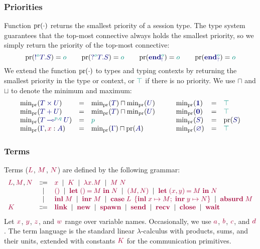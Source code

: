 \documentclass[main.tex]{subfiles}
\begin{document}
\subsubsection*{Priorities}
Function $\operatorname{pr}(\cdot)$ returns the smallest priority of a session type. The type system guarantees that the top-most connective always holds the smallest priority, so we simply return the priority of the top-most connective:
\[
  \pr(\ty{\tysend[\cs{o}]{T}{S}}) = \cs{o}
  \qquad
  \pr(\ty{\tyrecv[\cs{o}]{T}{S}}) = \cs{o}
  \qquad
  \pr(\ty{\tyends[\cs{o}]})       = \cs{o}
  \qquad
  \pr(\ty{\tyendr[\cs{o}]})       = \cs{o}
\]
We extend the function $\operatorname{pr}(\cdot)$ to types and typing contexts by returning the smallest priority in the type or context, or $\cs{\top}$ if there is no priority. We use $\sqcap$ and $\sqcup$ to denote the minimum and maximum:
\[
\begin{array}{lcl}
  \minpr(\ty{\typrod{T}{U}})                 & = & \minpr({\ty{T}})\sqcap\minpr({\ty{U}}) \\
  \minpr(\ty{\tysum{T}{U}})                  & = & \minpr({\ty{T}})\sqcap\minpr({\ty{U}}) \\
  \minpr(\ty{\tylolli[\cs{p},\cs{q}]{T}{U}}) & = & \cs{p} \\
  \minpr(\ty{\Gamma}, \tmty{x}{A})           & = & \minpr(\ty{\Gamma})\sqcap\pr(\ty{A})
\end{array}
\qquad
\begin{array}{lcl}
  \minpr(\ty{\tyunit})                       & = & \ptop \\
  \minpr(\ty{\tyvoid})                       & = & \ptop \\
  \minpr(\ty{S})                             & = & \pr(\ty{S}) \\
  \minpr(\ty{\emptyenv})                     & = & \ptop
\end{array}
\]

\subsubsection*{Terms}
Terms ($\tm{L}$, $\tm{M}$, $\tm{N}$) are defined by the following grammar:
\[
\begin{array}{lcl}
  \tm{L}, \tm{M}, \tm{N}
  & \Coloneqq & \tm{x}
    \sep        \tm{K}
    \sep        \tm{\lambda x.M}
    \sep        \tm{M\;N} \\
  & \sep      & \tm{\unit}
    \sep        \tm{\letunit{M}{N}}
    \sep        \tm{\pair{M}{N}}
    \sep        \tm{\letpair{x}{y}{M}{N}} \\
  & \sep      & \tm{\inl{M}}
    \sep        \tm{\inr{M}}
    \sep        \tm{\casesum{L}{x}{M}{y}{N}}
    \sep        \tm{\absurd{M}} \\
  \tm{K}
  & \Coloneqq & \tm{\link}
    \sep        \tm{\new}
    \sep        \tm{\spawn}
    \sep        \tm{\send}
    \sep        \tm{\recv}
    \sep        \tm{\close}
    \sep        \tm{\wait}
\end{array}
\]
Let $\tm{x}$, $\tm{y}$, $\tm{z}$, and $\tm{w}$ range over variable names. Occasionally, we use $\tm{a}$, $\tm{b}$, $\tm{c}$, and $\tm{d}$. The term language is the standard linear $\lambda$-calculus with products, sums, and their units, extended with constants $\tm{K}$ for the communication primitives. 
\end{document}
